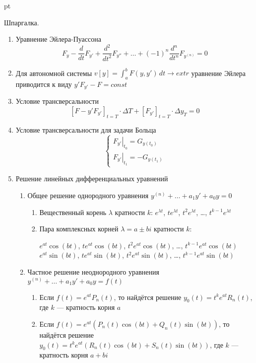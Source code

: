 \documentclass[pdftex,12pt,a4paper]{article}
\begin{document}
 pt %

Шпаргалка.

\begin{enumerate}
\item Уравнение Эйлера-Пуассона
\[
F_y-\frac{d}{dt}F_{y'}+\frac{d^2}{dt^2}F_{y''}+\ldots+(-1)^n\frac{d^n}{dt^n}F_{y^{(n)}}=0
\]

\item Для автономной системы $v[y]=\int_a^b F(y,y')\, dt \to extr$ уравнение Эйлера приводится к виду $y'F_{y'}-F=const$

\item Условие трансверсальности 
\[
[F-y'F_{y'}]_{t=T}\cdot \Delta T + [F_{y'}]_{t=T}\cdot \Delta y_T=0
\]

\item Условие трансверсальности для задачи Больца
\[
\begin{cases}
\left. F_{y'}\right|_{t_0}=G_{y(t_0)} \\
\left. F_{y'}\right|_{t_1}=-G_{y(t_1)}
\end{cases}
\]

\item Решение линейных дифференциальных уравнений

\begin{enumerate}
\item Общее решение однородного уравнения $y^{(n)}+\ldots+a_1 y'+a_0 y=0$
\begin{enumerate}
\item Вещественный корень $\lambda$ кратности $k$: $e^{\lambda t}$, $te^{\lambda t}$, $t^2e^{\lambda t}$, \ldots, $t^{k-1}e^{\lambda t}$
\item Пара комплексных корней $\lambda=a\pm bi$  кратности $k$:

$e^{at}\cos(bt)$, $te^{at}\cos(bt)$, $t^2e^{at}\cos(bt)$, \ldots, $t^{k-1}e^{at}\cos(bt)$ \\
$e^{at}\sin(bt)$, $te^{at}\sin(bt)$, $t^2e^{at}\sin(bt)$, \ldots, $t^{k-1}e^{at}\sin(bt)$
\end{enumerate}
\item Частное решение неоднородного уравнения $y^{(n)}+\ldots+a_1 y'+a_0 y=f(t)$
\begin{enumerate}
\item Если $f(t)=e^{at}P_n(t)$, то найдётся решение $y_0(t)=t^k e^{at} R_n(t)$, где $k$ --- кратность корня $a$
\item Если $f(t)=e^{at}(P_n(t)\cos(bt)+Q_n(t)\sin(bt))$, то найдётся решение $y_0(t)=t^k e^{at}(R_n(t)\cos(bt)+S_n(t)\sin(bt))$, где $k$ --- кратность корня $a+bi$
\end{enumerate}
\end{enumerate}

\end{enumerate}
\end{document}

